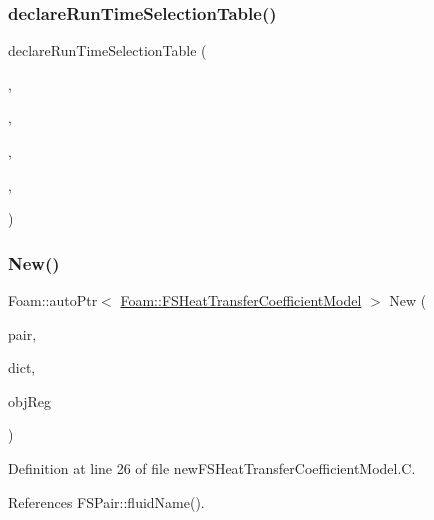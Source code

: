 \subsubsection{\texorpdfstring{declare\+Run\+Time\+Selection\+Table()}{declareRunTimeSelectionTable()}}
{\footnotesize\ttfamily declare\+Run\+Time\+Selection\+Table (\begin{DoxyParamCaption}\item[{auto\+Ptr}]{,  }\item[{\hyperlink{classFoam_1_1FSHeatTransferCoefficientModel}{F\+S\+Heat\+Transfer\+Coefficient\+Model}}]{,  }\item[{F\+S\+Heat\+Transfer\+Coefficient\+Models}]{,  }\item[{(const \hyperlink{classFoam_1_1FSPair}{F\+S\+Pair} \&pair, const dictionary \&dict, const object\+Registry \&obj\+Reg)}]{,  }\item[{(pair, dict, obj\+Reg)}]{ }\end{DoxyParamCaption})}

\mbox{\label{classFoam_1_1FSHeatTransferCoefficientModel_a36b78812f386917072b03a36268d6bce}} 
\subsubsection{\texorpdfstring{New()}{New()}}
{\footnotesize\ttfamily Foam\+::auto\+Ptr$<$ \hyperlink{classFoam_1_1FSHeatTransferCoefficientModel}{Foam\+::\+F\+S\+Heat\+Transfer\+Coefficient\+Model} $>$ New (\begin{DoxyParamCaption}\item[{const \hyperlink{classFoam_1_1FSPair}{F\+S\+Pair} \&}]{pair,  }\item[{const dictionary \&}]{dict,  }\item[{const object\+Registry \&}]{obj\+Reg }\end{DoxyParamCaption})\hspace{0.3cm}{\ttfamily [static]}}



Definition at line 26 of file new\+F\+S\+Heat\+Transfer\+Coefficient\+Model.\+C.



References F\+S\+Pair\+::fluid\+Name().



